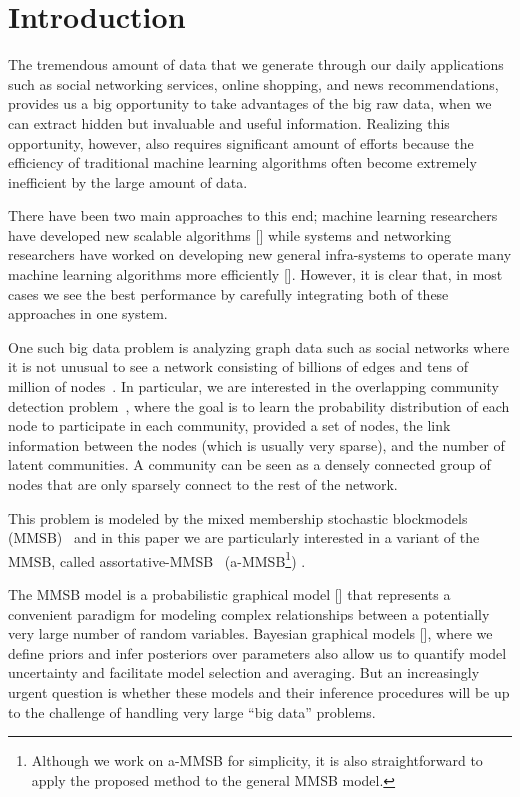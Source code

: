 \section{Introduction}
The tremendous amount of data that we generate through our daily applications such as social networking services, online shopping, and news recommendations, provides us a big opportunity to take advantages of the big raw data, when we can extract hidden but invaluable and useful information. Realizing this opportunity, however, also requires significant amount of efforts because the efficiency of traditional machine learning algorithms often become extremely inefficient by the large amount of data. 

There have been two main approaches to this end; machine learning researchers have developed new scalable algorithms [] while systems and networking researchers have worked on developing new general infra-systems to operate many machine learning algorithms more efficiently []. However, it is clear that, in most cases we see the best performance by carefully integrating both of these approaches in one system. 

One such big data problem is analyzing graph data such as social networks where it is not unusual to see a network consisting of billions of edges and tens of million of nodes~\cite{}. In particular, we are interested in the overlapping community detection problem~\cite{}, where the goal is to learn the probability distribution of each node to participate in each community, provided a set of nodes, the link information between the nodes (which is usually very sparse), and the number of latent communities. A community can be seen as a densely connected group of nodes that are only sparsely connect to the rest of the network. 

This problem is modeled by the mixed membership stochastic blockmodels (MMSB)~\cite{airoldi2009mixed} and in this paper we are particularly interested in a variant of the MMSB, called assortative-MMSB~\cite{gopalan2012scalable} (a-MMSB\footnote{Although we work on a-MMSB for simplicity, it is also straightforward to apply the proposed method to the general MMSB model.}) \cite{gopalan2012scalable}. 

The MMSB model is a probabilistic graphical model [] that represents a convenient paradigm for modeling complex relationships between a potentially very large number of random variables. Bayesian graphical models [], where we define priors and infer posteriors over parameters also allow us to quantify model uncertainty and facilitate model selection and averaging. But an increasingly urgent question is whether these models and their inference procedures will be up to the challenge of handling very large ``big data'' problems. 

